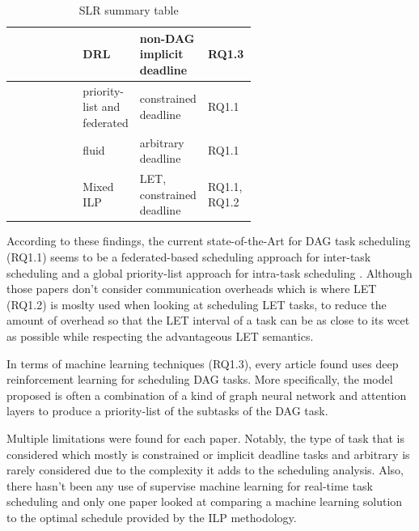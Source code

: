 \begin{table}
\begin{tabular}[]{|l|p{0.20\linewidth}|p{0.20\linewidth}|p{0.20\linewidth}|}
        \cite{Xu2023DRLtaskSched} & DRL & non-DAG implicit deadline & RQ1.3\\%
        \hline
        \cite{Zhao2022DAGsched} & priority-list and federated & constrained deadline & RQ1.1\\%
        \hline
        \cite{GuanFluidDag2022} & fluid & arbitrary deadline & RQ1.1\\%
        \hline
        \cite{Pazzaglia2021DMALETtransfer} & Mixed ILP & LET, constrained deadline & RQ1.1, RQ1.2\\%
        \hline
    \end{tabular}
    \caption{SLR summary table}
    \label{tab:slt_sum_table}
\end{table}

According to these findings,
the current state-of-the-Art for DAG task scheduling (RQ1.1)
seems to be a federated-based scheduling approach for inter-task 
scheduling and a global priority-list approach for intra-task scheduling
\cite{He2023DegreeOfParallelism}\cite{Zhao2022DAGsched}.
Although those papers don't consider communication overheads
which is where LET (RQ1.2) is moslty used when looking at scheduling 
LET tasks, to reduce the amount of overhead 
so that the LET interval of a task can be as close to 
its wcet as possible while respecting the advantageous LET semantics.

In terms of machine learning techniques (RQ1.3), every article found uses 
deep reinforcement learning for scheduling DAG tasks.
More specifically, the model proposed is often a combination
of a kind of graph neural network and attention layers 
to produce a priority-list of the subtasks of the DAG task.

Multiple limitations were found for each 
paper. Notably, the type of task that is 
considered which mostly is constrained or implicit deadline tasks
and arbitrary is rarely considered due to the complexity it adds
to the scheduling analysis.
Also, there hasn't been any use of supervise machine learning 
for real-time task scheduling
and only one paper looked at comparing a machine learning solution
to the optimal schedule provided by the ILP methodology.